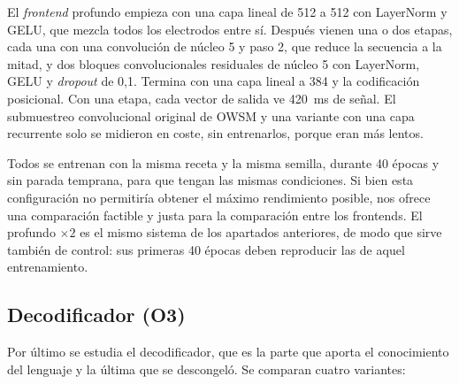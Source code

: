 El \textit{frontend} profundo empieza con una capa lineal de 512 a 512 con LayerNorm y GELU, que mezcla todos los electrodos entre sí. Después vienen una o dos etapas, cada una con una convolución de núcleo 5 y paso 2, que reduce la secuencia a la mitad, y dos bloques convolucionales residuales de núcleo 5 con LayerNorm, GELU y \textit{dropout} de 0,1. Termina con una capa lineal a 384 y la codificación posicional. Con una etapa, cada vector de salida ve \SI{420}{\milli\second} de señal. El submuestreo convolucional original de OWSM y una variante con una capa recurrente solo se midieron en coste, sin entrenarlos, porque eran más lentos.

Todos se entrenan con la misma receta y la misma semilla, durante 40 épocas y sin parada temprana, para que tengan las mismas condiciones. Si bien esta configuración no permitiría obtener el máximo rendimiento posible, nos ofrece una comparación factible y justa para la comparación entre los frontends. El profundo $\times 2$ es el mismo sistema de los apartados anteriores, de modo que sirve también de control: sus primeras 40 épocas deben reproducir las de aquel entrenamiento.


\subsection{Decodificador (O3)}

Por último se estudia el decodificador, que es la parte que aporta el conocimiento del lenguaje y la última que se descongeló. Se comparan cuatro variantes:

